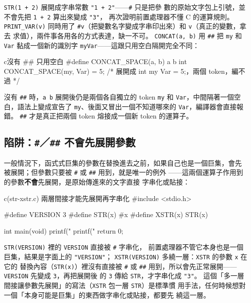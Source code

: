 \texttt{STR(1 + 2)} 展開成字串常數 \texttt{"1 + 2"}——\texttt{\#} 只是把參
數的原始文字包上引號，並不會先把 \texttt{1 + 2} 算出來變成 \texttt{"3"}，
再次證明前置處理器不懂 C 的運算規則。 \texttt{PRINT\_VAR(v)} 同時用了
\texttt{\#v}（把變數名字變成字串印出來）和 \texttt{v}（真正的變數，拿去
求值），兩件事各用各的方式表達，缺一不可。 \texttt{CONCAT(a, b)} 用
\texttt{\#\#} 把 \texttt{my} 和 \texttt{Var} 黏成一個新的識別字
\texttt{myVar}——這跟只用空白隔開完全不同：

\begin{code}{c}{沒有 \#\# 只用空白}
#define CONCAT_SPACE(a, b) a b
int CONCAT_SPACE(my, Var) = 5;  /* 展開成 int my Var = 5;，兩個 token，編不過 */
\end{code}

沒有 \texttt{\#\#} 時，\texttt{a b} 展開後仍是兩個各自獨立的 token
\texttt{my} 和 \texttt{Var}，中間隔著一個空白，語法上變成宣告了
\texttt{my}、後面又冒出一個不知道哪來的 \texttt{Var}，編譯器會直接報錯。
\texttt{\#\#} 才是真正把兩個 token 熔接成一個新 token 的運算子。

\subsection{陷阱：\texttt{\#}／\texttt{\#\#} 不會先展開參數}

一般情況下，函式式巨集的參數在替換進去之前，如果自己也是一個巨集，會先
被展開；但參數只要被 \texttt{\#} 或 \texttt{\#\#} 用到，就是唯一的例外
——這兩個運算子作用到的參數\textbf{不會}先展開，是原始傳進來的文字直接
字串化或貼接：

\begin{example}{c}{(str-xstr.c) 兩層間接才能先展開再字串化}
#include <stdio.h>

#define VERSION 3
#define STR(x) #x
#define XSTR(x) STR(x)

int main(void) {
    printf("%
    printf("%
    return 0;
}
\end{example}


\texttt{STR(VERSION)} 裡的 \texttt{VERSION} 直接被 \texttt{\#} 字串化，
前置處理器不管它本身也是一個巨集，結果是字面上的 \texttt{"VERSION"}；
\texttt{XSTR(VERSION)} 多繞一層：\texttt{XSTR} 的參數 \texttt{x} 在它的
替換內容（\texttt{STR(x)}）裡沒有直接被 \texttt{\#} 或 \texttt{\#\#}
用到，所以會先正常展開——\texttt{VERSION} 先變成 \texttt{3}，再把展開後
的 \texttt{3} 傳給 \texttt{STR}，才字串化成 \texttt{"3"}。 這個「多一層
間接讓參數先展開」的寫法（\texttt{XSTR} 包一層 \texttt{STR}）是標準慣
用手法，任何時候想對一個「本身可能是巨集」的東西做字串化或貼接，都要先
繞這一層。

